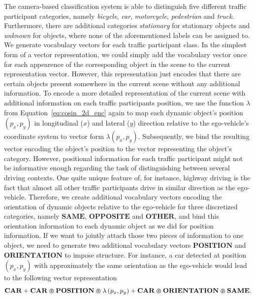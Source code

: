 The camera-based classification system is able to distinguish five different traffic participant categories, namely \emph{bicycle}, \emph{car}, \emph{motorcycle}, \emph{pedestrian} and \emph{truck}.
Furthermore, there are additional categories \emph{stationary} for stationary objects and \emph{unknown} for objects, where none of the aforementioned labels can be assigned to.
We generate vocabulary vectors for each traffic participant class.
In the simplest form of a vector representation, we could simply add the vocabulary vector once for each appearence of the corresponding object in the scene to the current representation vector. 
However, this representation just encodes that there are certain objects present somewhere in the current scene without any additional information.
To encode a more detailed representation of the current scene with additional information on each traffic participants position, we use the function $\lambda$ from Equation~\eqref{eq:cosin_2d_enc} again to map each dynamic object's position $(p_x, p_y)$ in longitudinal ($x$) and lateral ($y$) direction relative to the ego-vehicle's coordinate system to vector form $ \lambda(p_x, p_y)$.
Subsequently, we bind the resulting vector encoding the object's position to the vector representing the object's category.
However, positional information for each traffic participant might not be informative enough regarding the task of distinguishing between several driving contexts.
One quite unique feature of, for instance, highway driving is the fact that almost all other traffic participants drive in similar direction as the ego-vehicle.
Therefore, we create additional vocabulary vectors encoding the orientation of dynamic objects relative to the ego-vehicle for three discretized categories, namely $\mathbf{SAME}$, $\mathbf{OPPOSITE}$ and $\mathbf{OTHER}$, and  bind this orientation information to each dynamic object as we did for position information.
If we want to jointly attach those two pieces of information to one object, we need to generate two additional vocabulary vectors $\mathbf{POSITION}$ and $\mathbf{ORIENTATION }$ to impose structure.
For instance, a car detected at position $\left(p_x,p_y\right)$ with approximately the same orientation as the ego-vehicle would lead to the following vector representation
\begin{equation}
\label{eq:pos_orientation_context_class}
\mathbf{CAR} + \mathbf{CAR}\varoast\mathbf{POSITION}\varoast\lambda\left(p_x,p_y\right) + \mathbf{CAR}\varoast\mathbf{ORIENTATION}\varoast\mathbf{SAME}.
\end{equation}

